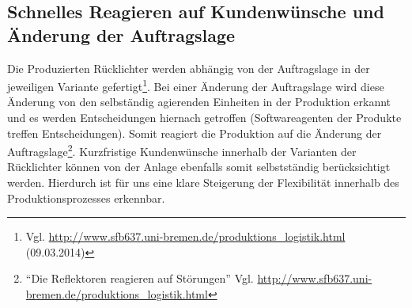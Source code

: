 \subsection{Schnelles Reagieren auf Kundenwünsche und Änderung der Auftragslage}
\label{sec:SchnelleAenderung}

Die Produzierten Rücklichter werden abhängig von der Auftragslage in der jeweiligen
Variante gefertigt\footnote{Vgl. \url{http://www.sfb637.uni-bremen.de/produktions_logistik.html} (09.03.2014)}. 
Bei einer Änderung 
der Auftragslage wird diese Änderung von den selbständig agierenden Einheiten in der Produktion erkannt und es werden 
Entscheidungen hiernach getroffen (Softwareagenten der Produkte treffen Entscheidungen). Somit reagiert die Produktion auf 
die Änderung der Auftragslage\footnote{"`Die Reflektoren reagieren auf Störungen"' Vgl. \url{http://www.sfb637.uni-bremen.de/produktions_logistik.html}}.
Kurzfristige Kundenwünsche innerhalb der Varianten der Rücklichter können von der Anlage 
ebenfalls somit selbstständig berücksichtigt werden. Hierdurch ist für uns eine klare Steigerung der
Flexibilität innerhalb des Produktionsprozesses erkennbar.

